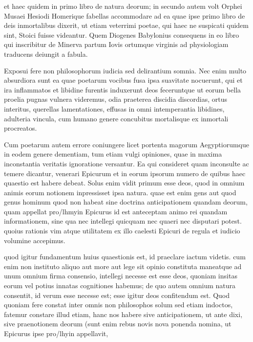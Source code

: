  et haec quidem in primo libro de natura deorum; in secundo autem volt Orphei Musaei Hesiodi Homerique fabellas accommodare ad ea quae ipse primo libro de deis inmortalibus dixerit, ut etiam veterrimi poetae, qui haec ne suspicati quidem sint, Stoici fuisse videantur. Quem Diogenes Babylonius consequens in eo libro qui inscribitur de Minerva partum Iovis ortumque virginis ad physiologiam traducens deiungit a fabula.

 Exposui fere non philosophorum iudicia sed delirantium somnia. Nec enim multo absurdiora sunt ea quae poetarum vocibus fusa ipsa suavitate nocuerunt, qui et ira inflammatos et libidine furentis induxerunt deos feceruntque ut eorum bella proelia pugnas vulnera videremus, odia praeterea discidia discordias, ortus interitus, querellas lamentationes, effusas in omni intemperantia libidines, adulteria vincula, cum humano genere concubitus mortalisque ex inmortali procreatos.

 Cum poetarum autem errore coniungere licet portenta magorum Aegyptiorumque in eodem genere dementiam, tum etiam vulgi opiniones, quae in maxima inconstantia veritatis ignoratione versantur. Ea qui consideret quam inconsulte ac temere dicantur, venerari Epicurum et in eorum ipsorum numero de quibus haec quaestio est habere debeat. Solus enim vidit primum esse deos, quod in omnium animis eorum notionem inpressisset ipsa natura. quae est enim gens aut quod genus hominum quod non habeat sine doctrina anticipationem quandam deorum, quam appellat pro/lhmyin Epicurus id est anteceptam animo rei quandam informationem, sine qua nec intellegi quicquam nec quaeri nec disputari potest. quoius rationis vim atque utilitatem ex illo caelesti Epicuri de regula et iudicio volumine accepimus.

 quod igitur fundamentum huius quaestionis est, id praeclare iactum videtis. cum enim non instituto aliquo aut more aut lege sit opinio constituta maneatque ad unum omnium firma consensio, intellegi necesse est esse deos, quoniam insitas eorum vel potius innatas cognitiones habemus; de quo autem omnium natura consentit, id verum esse necesse est; esse igitur deos confitendum est. Quod quoniam fere constat inter omnis non philosophos solum sed etiam indoctos, fatemur constare illud etiam, hanc nos habere sive anticipationem, ut ante dixi, sive praenotionem deorum (sunt enim rebus novis nova ponenda nomina, ut Epicurus ipse pro/lhyin appellavit,

